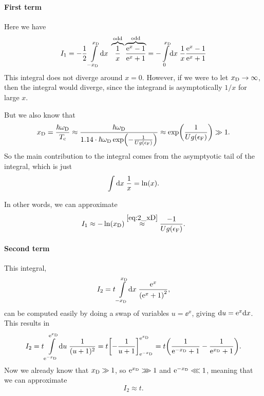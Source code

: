 \documentclass[11pt,letter, swedish, english
]{article}
\newcommand{\Tc}{\ensuremath{T_{\text{c}}}}
\newcommand{\eF}{\ensuremath{\epsilon_{\text{F}}}}
\newcommand{\wD}{\ensuremath{\omega_{\text{D}}}}
\begin{document}
\paragraph{First term}
Here we have
\vspace{-11pt}\begin{equation}
I_1=-\frac{1}{2}\int_{-\xD}^{\xD}\!\rd{x}\;
\overbrace{\frac{1}{x}}^{\text{odd}}
\overbrace{\frac{\ee^x-1}{\ee^x+1}}^{\text{odd}}
=-\int_{0}^{\xD}\!\rd{x}\;
\frac{1}{x}\frac{\ee^x-1}{\ee^x+1}
\end{equation}
This integral does not diverge around $x=0$. However, if we were to let
$x_{\text{D}}\to\infty$, then the integral would diverge, since the integrand
is asymptotically $1/x$ for large $x$. 

But we also know that
\begin{equation}\label{eq:2_xD}
\xD=\frac{\hbar\wD}{\Tc}
\approx\frac{\hbar\wD}{1.14\cdot\hbar\wD\exp(-\frac{1}{Ug(\eF)})}
\approx\exp(\frac{1}{Ug(\eF)})\gg1.
\end{equation}
So the main contribution to the integral comes from the asymptyotic
tail of the integral, which is just
\begin{equation}
\int\rd{x}\;\frac{1}{x}=\ln(x).
\end{equation}

In other words, we can approximate
\begin{equation}
I_1\approx -\ln(\xD)\stackrel{\eqref{eq:2_xD}}{\approx} 
\frac{-1}{Ug(\eF)}.
\end{equation}

\paragraph{Second term}
This integral,
\begin{equation}
I_2=t\int_{-\xD}^{\xD}\!\rd{x}\;
\frac{\ee^{x}}{\qty(\ee^{x}+1)^2},
\end{equation}
can be computed easily by doing a swap of variables $u=\ee^x$, giving
$\mathrm{d}{u}=\mathrm{e}^x\mathrm{d}{x}$. This results in
\begin{equation}
I_2=t\int_{\ee^{-\xD}}^{\ee^{\xD}}\!\rd{u}\;
\frac{1}{(u+1)^2}
=t\qty[-\frac{1}{u+1}]_{\ee^{-\xD}}^{\ee^{\xD}}
=t\qty(\frac{1}{\ee^{-\xD}+1}-\frac{1}{\ee^{\xD}+1}).
\end{equation}
Now we already know that $x_{\text{D}}\gg1$, so $\mathrm{e}^{x_{\text{D}}}\ggg1$ and
$\mathrm{e}^{-x_{\text{D}}}\lll1$, meaning that we can approximate
\begin{equation}
I_2\approx t.
\end{equation}
\end{document}
